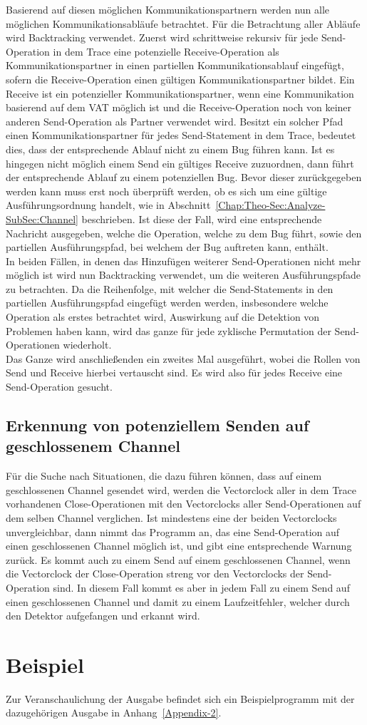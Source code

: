 Basierend auf diesen möglichen Kommunikationspartnern werden nun alle möglichen
Kommunikationsabläufe betrachtet. Für die Betrachtung aller Abläufe 
wird Backtracking verwendet. Zuerst wird schrittweise rekursiv für jede Send-Operation 
in dem Trace eine potenzielle Receive-Operation als Kommunikationspartner 
in einen partiellen Kommunikationsablauf eingefügt, sofern die 
Receive-Operation einen gültigen Kommunikationspartner bildet. Ein Receive 
ist ein potenzieller Kommunikationspartner, wenn eine Kommunikation 
basierend auf dem VAT möglich ist und die Receive-Operation noch von keiner 
anderen Send-Operation als Partner verwendet wird. Besitzt ein solcher Pfad 
einen Kommunikationspartner für jedes Send-Statement in dem Trace, bedeutet dies, 
dass der entsprechende Ablauf nicht zu einem Bug führen kann. Ist es hingegen 
nicht möglich einem Send ein gültiges Receive zuzuordnen, dann führt der 
entsprechende Ablauf zu einem potenziellen Bug. Bevor dieser zurückgegeben 
werden kann muss erst noch überprüft werden, ob es sich um eine 
gültige Ausführungsordnung handelt, wie in Abschnitt~\ref{Chap:Theo-Sec:Analyze-SubSec:Channel} 
beschrieben. Ist diese der Fall, wird eine entsprechende Nachricht ausgegeben, 
welche die Operation, welche zu dem Bug führt, sowie den partiellen
Ausführungspfad, bei welchem der Bug auftreten kann, enthält.\\In beiden 
Fällen, in denen das Hinzufügen weiterer Send-Operationen nicht mehr möglich ist 
wird nun Backtracking verwendet, um die weiteren Ausführungspfade zu betrachten.
Da die Reihenfolge, mit welcher die Send-Statements in den partiellen 
Ausführungspfad eingefügt werden werden, insbesondere welche Operation als erstes 
betrachtet wird, Auswirkung auf die Detektion von Problemen haben kann, 
wird das ganze für jede zyklische Permutation der Send-Operationen wiederholt. \\
Das Ganze wird anschließenden ein zweites Mal ausgeführt, wobei die Rollen 
von Send und Receive hierbei vertauscht sind. Es wird also für jedes Receive 
eine Send-Operation gesucht. 

\subsection{Erkennung von potenziellem Senden auf geschlossenem Channel}
Für die Suche nach Situationen, die dazu führen können, dass auf einem 
geschlossenen Channel gesendet wird, werden die Vectorclock aller in dem 
Trace vorhandenen Close-Operationen mit den Vectorclocks aller Send-Operationen
auf dem selben Channel verglichen. Ist mindestens eine der beiden Vectorclocks 
unvergleichbar, dann nimmt das Programm an, das eine Send-Operation auf 
einen geschlossenen Channel möglich ist, und gibt eine entsprechende 
Warnung zurück. Es kommt auch zu einem Send auf einem geschlossenen Channel, 
wenn die Vectorclock der Close-Operation streng vor den Vectorclocks 
der Send-Operation sind. In diesem Fall kommt es aber in jedem Fall zu einem 
Send auf einen geschlossenen Channel und damit zu einem Laufzeitfehler, 
welcher durch den Detektor aufgefangen und erkannt wird.


\section{Beispiel}
Zur Veranschaulichung der 
Ausgabe befindet sich ein Beispielprogramm mit der dazugehörigen Ausgabe 
in Anhang~\ref{Appendix-2}. 